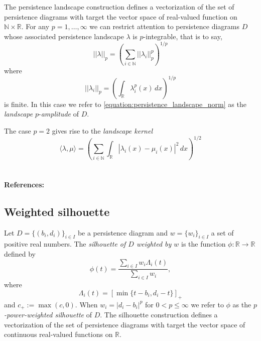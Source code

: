\documentclass{amsart}
\begin{document}
	The persistence landscape construction defines a
	vectorization of the set of persistence diagrams with target the vector space of real-valued function on $\mathbb N \times \mathbb R$. For any $p = 1,\dots,\infty$ we can restrict attention to persistence diagrams $D$ whose associated persistence landscape $\lambda$ is
	$p$-integrable, that is to say,	
	\begin{equation} \label{equation:persistence_landscape_norm}	
	||\lambda||_p = \left( \sum_{i \in \mathbb N} ||\lambda_i||^p_p \right)^{1/p}	
	\end{equation}	
	where
	\begin{equation*}	
	||\lambda_i||_p = \left( \int_{\mathbb R} \lambda_i^p(x)\, dx \right)^{1/p}	
	\end{equation*}	
	is finite. In this case we refer to \eqref{equation:persistence_landscape_norm} as the
	\textit{landscape} $p$-\textit{amplitude} of $D$.
	
	The case $p = 2$ gives rise to the \textit{landscape kernel}
	\begin{equation*}
	\langle \lambda, \mu \rangle = \left(\sum_{i \in \mathbb N} \int_{\mathbb R} |\lambda_i(x) - \mu_i(x)|^2\, dx\right)^{1/2}
	\end{equation*}

	\paragraph{\\ References:} \cite{bubenik2015statistical}
	
	\subsection*{Weighted silhouette} \label{weighted_silhouette}
	
	Let $D = \{(b_i, d_i)\}_{i \in I}$ be a
	persistence diagram and $w = \{w_i\}_{i \in I}$ a set of positive real numbers. The \textit{silhouette of $D$ weighted by $w$} is the function $\phi : \mathbb R \to \mathbb R$ defined by	
	\begin{equation*}	
	\phi(t) = \frac{\sum_{i \in I}w_i \Lambda_i(t)}{\sum_{i \in I}w_i},	
	\end{equation*}	
	where	
	\begin{equation*}
	\Lambda_i(t) = \left[ \min \{t-b_i, d_i-t\}\right]_+	
	\end{equation*}	
	and $c_+ := \max(c,0)$. When $w_i = \vert d_i - b_i \vert^p$ for $0 < p \leq \infty$ we refer to $\phi$ as the \textit{$p$-power-weighted silhouette} of $D$. The silhouette construction defines a
	vectorization of the set of persistence diagrams with target the vector space of continuous real-valued functions on $\mathbb R$.	
	
\end{document}
